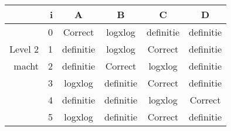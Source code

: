 \begin{tabular}{ rr| c|c|c|c}\hline\hline
     & i & \textbf{A} & \textbf{B} & \textbf{C} & \textbf{D}\\\hline

&0&Correct\cellcolor[gray]{0.6}&logxlog&definitie&definitie\\
Level 2 & 1&definitie&logxlog&Correct\cellcolor[gray]{0.6}&definitie\\
macht &2&definitie&Correct\cellcolor[gray]{0.6}&logxlog&definitie\\
&3&logxlog&definitie&Correct\cellcolor[gray]{0.6}&definitie\\
&4&definitie&definitie&logxlog&Correct\cellcolor[gray]{0.6}\\
&5&logxlog&definitie&Correct\cellcolor[gray]{0.6}&definitie\\
\hline\end{tabular}\par\ \newline

